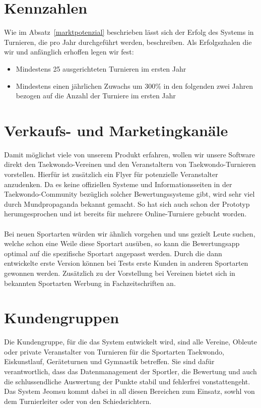 \section{Kennzahlen}

Wie im Absatz~\ref{marktpotenzial} beschrieben lässt sich der Erfolg des Systems in Turnieren, die pro Jahr
durchgeführt werden, beschreiben.
Als Erfolgszhalen die wir und anfänglich erhoffen legen wir fest:
\begin{itemize}
	\item Mindestens 25 ausgerichteten Turnieren im ersten Jahr
	\item Mindestens einen jährlichen Zuwachs um 300\% in den folgenden zwei Jahren bezogen auf die Anzahl der
	Turniere im ersten Jahr
\end{itemize}

\section{Verkaufs- und Marketingkanäle}

Damit möglichst viele von unserem Produkt erfahren, wollen wir unsere Software direkt den Taekwondo-Vereinen und
den Veranstaltern von Taekwondo-Turnieren vorstellen.
Hierfür ist zusätzlich ein Flyer für potenzielle Veranstalter anzudenken.
Da es keine offiziellen Systeme und Informationsseiten in der Taekwondo-Community bezüglich solcher Bewertungssysteme
gibt, wird sehr viel durch Mundpropaganda bekannt gemacht.
So hat sich auch schon der Prototyp herumgesprochen und ist bereits für mehrere Online-Turniere gebucht worden.
\\\\
Bei neuen Sportarten würden wir ähnlich vorgehen und uns gezielt Leute suchen, welche schon eine Weile diese Sportart
	ausüben, so kann die Bewertungsapp optimal auf die spezifische Sportart angepasst werden.
Durch die dann entwickelte erste Version können bei Tests erste Kunden in anderen Sportarten gewonnen werden.
Zusätzlich zu der Vorstellung bei Vereinen bietet sich in bekannten Sportarten Werbung in Fachzeitschriften an.

\section{Kundengruppen}

Die Kundengruppe, für die das System entwickelt wird, sind alle Vereine, Obleute oder private Veranstalter von
Turnieren für die Sportarten Taekwondo, Eiskunstlauf, Geräteturnen und Gymnastik betreffen.
Sie sind dafür verantwortlich, dass das Datenmanagement der Sportler, die Bewertung und auch die schlussendliche
Auswertung der Punkte stabil und fehlerfrei vonstattengeht.
Das System Jeomsu kommt dabei in all diesen Bereichen zum Einsatz, sowhl von dem Turnierleiter oder von den
Schiedsrichtern.